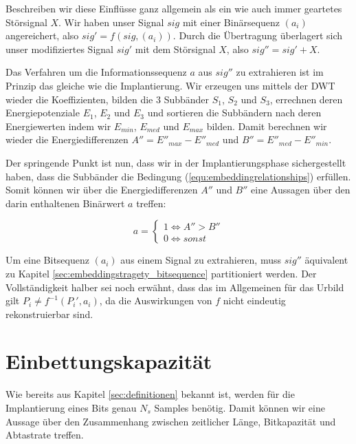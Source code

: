 Beschreiben wir diese Einflüsse ganz allgemein als ein wie auch immer geartetes Störsignal $X$. Wir haben unser Signal $sig$ mit einer Binärsequenz $({a}_{i})$ angereichert, also $sig' = f( sig, ({a}_{i}))$. Durch die Übertragung überlagert sich unser modifiziertes Signal $sig'$ mit dem Störsignal $X$, also $sig'' = sig' + X$.

Das Verfahren um die Informationssequenz $a$ aus $sig''$ zu extrahieren ist im Prinzip das gleiche wie die Implantierung. Wir erzeugen uns mittels der DWT wieder die Koeffizienten, bilden die 3 Subbänder ${S}_{1}$, ${S}_{2}$ und ${S}_{3}$, errechnen deren Energiepotenziale ${E}_{1}$, ${E}_{2}$ und ${E}_{3}$ und sortieren die Subbändern nach deren Energiewerten indem wir ${E}_{min}$, ${E}_{med}$ und ${E}_{max}$ bilden. Damit berechnen wir wieder die Energiedifferenzen $A'' = {E''}_{max} - {E''}_{med}$ und $B'' = {E''}_{med} - {E''}_{min}$.

Der springende Punkt ist nun, dass wir in der Implantierungsphase sichergestellt haben, dass die Subbänder die Bedingung (\ref{equ:embeddingrelationships}) erfüllen. Somit können wir über die Energiedifferenzen $A''$ und $B''$ eine Aussagen über den darin enthaltenen Binärwert $a$ treffen:

	 \begin{equation}
		 a = \begin{cases}
    	 	1 \iff A'' > B''	 
			\\
    		0 \iff sonst
  		 \end{cases}
	 	\label{equ:extraction_bedingungen}
	 \end{equation}
	 
Um eine Bitsequenz $({a}_{i})$ aus einem Signal zu extrahieren, muss $sig''$ äquivalent zu Kapitel \ref{sec:embeddingstragety_bitsequence} partitioniert werden. Der Vollständigkeit halber sei noch erwähnt, dass das im Allgemeinen für das Urbild gilt ${P}_{i} \neq f^{-1}({P}_{i}', {a}_{i})$, da die Auswirkungen von $f$ nicht eindeutig rekonstruierbar sind. 

\section{Einbettungskapazit\"at}

Wie bereits aus Kapitel \ref{sec:definitionen} bekannt ist, werden für die Implantierung eines Bits genau $N_s$ Samples benötig. Damit können wir eine Aussage über den Zusammenhang zwischen zeitlicher Länge, Bitkapazität und Abtastrate treffen. 

